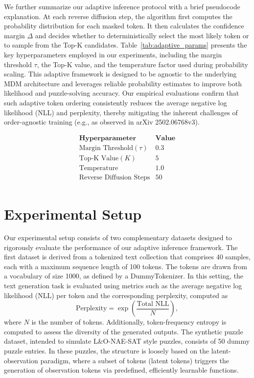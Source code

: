 \documentclass{article}
\begin{document}
We further summarize our adaptive inference protocol with a brief pseudocode explanation. At each reverse diffusion step, the algorithm first computes the probability distribution for each masked token. It then calculates the confidence margin \(\Delta\) and decides whether to deterministically select the most likely token or to sample from the Top-K candidates. Table~\ref{tab:adaptive_params} presents the key hyperparameters employed in our experiments, including the margin threshold \(\tau\), the Top-K value, and the temperature factor used during probability scaling. This adaptive framework is designed to be agnostic to the underlying MDM architecture and leverages reliable probability estimates to improve both likelihood and puzzle-solving accuracy. Our empirical evaluations confirm that such adaptive token ordering consistently reduces the average negative log likelihood (NLL) and perplexity, thereby mitigating the inherent challenges of order-agnostic training (e.g., as observed in arXiv 2502.06768v3).

\[
\begin{array}{l|c}
\textbf{Hyperparameter} & \textbf{Value} \\\hline
\text{Margin Threshold} (\tau) & 0.3 \\
\text{Top-K Value} (K) & 5 \\
\text{Temperature} & 1.0 \\
\text{Reverse Diffusion Steps} & 50 \\
\end{array}
\]

\section{Experimental Setup}
Our experimental setup consists of two complementary datasets designed to rigorously evaluate the performance of our adaptive inference framework. The first dataset is derived from a tokenized text collection that comprises 40 samples, each with a maximum sequence length of 100 tokens. The tokens are drawn from a vocabulary of size 1000, as defined by a DummyTokenizer. In this setting, the text generation task is evaluated using metrics such as the average negative log likelihood (NLL) per token and the corresponding perplexity, computed as 
\[
\text{Perplexity} = \exp\left(\frac{\text{Total NLL}}{N}\right),
\]
where \(N\) is the number of tokens. Additionally, token-frequency entropy is computed to assess the diversity of the generated outputs. The synthetic puzzle dataset, intended to simulate L\&O-NAE-SAT style puzzles, consists of 50 dummy puzzle entries. In these puzzles, the structure is loosely based on the latent-observation paradigm, where a subset of tokens (latent tokens) triggers the generation of observation tokens via predefined, efficiently learnable functions.
\end{document}
